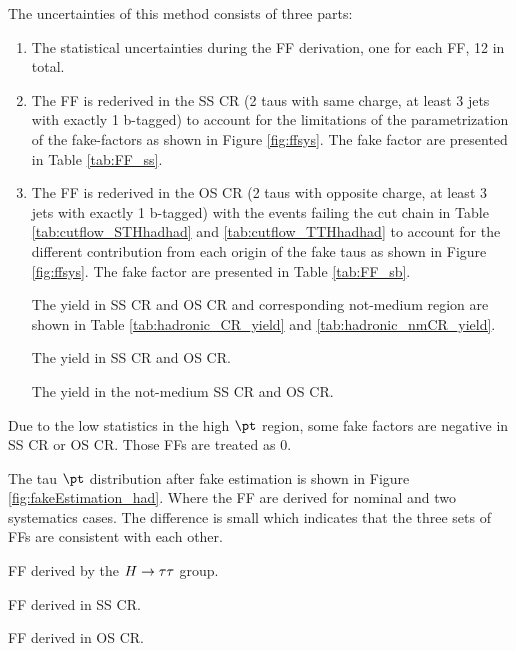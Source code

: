 The uncertainties of this method consists of three parts:
\begin{enumerate}

\item The statistical uncertainties during the FF derivation, one for each FF, 12 in total.

\item The FF is rederived in the SS CR (2 taus with same charge, at least 3 jets with exactly 1 b-tagged) to account for the limitations of the parametrization of the fake-factors as shown in Figure \ref{fig:ffsys}. The fake factor are presented in Table \ref{tab:FF_ss}. 

\item The FF is rederived in the OS CR (2 taus with opposite charge, at least 3 jets with exactly 1 b-tagged) with the events failing the cut chain in Table \ref{tab:cutflow_STHhadhad} and \ref{tab:cutflow_TTHhadhad} to account for the different contribution from each origin of the fake taus as shown in Figure \ref{fig:ffsys}. The fake factor are presented in Table \ref{tab:FF_sb}.

The yield in SS CR and OS CR and corresponding not-medium region are shown in Table \ref{tab:hadronic_CR_yield} and \ref{tab:hadronic_nmCR_yield}.

\begin{table}
\caption{The yield in SS CR and OS CR.}
\label{tab:hadronic_CR_yield}

\end{table}

\begin{table}
\caption{The yield in the not-medium SS CR and OS CR.}
\label{tab:hadronic_nmCR_yield}

\end{table}

\end{enumerate}



Due to the low statistics in the high $\pt$ region, some fake factors are negative in SS CR or OS CR. Those FFs are treated as 0.

The tau $\pt$ distribution after fake estimation is shown in Figure \ref{fig:fakeEstimation_had}. Where the FF are derived for nominal and two systematics cases. The difference is small which indicates that the three sets of FFs are consistent with each other.



\begin{table}
\caption{FF derived by the $H \rightarrow \tau\tau$ group.}
\label{tab:FF_htautau}

\end{table}

\begin{table}
\caption{FF derived in SS CR.}
\label{tab:FF_ss}

\end{table}

\begin{table}
\caption{FF derived in OS CR.}
\label{tab:FF_sb}

\end{table}

\clearpage
